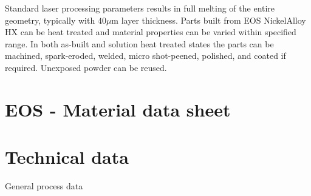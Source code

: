 \documentclass[10pt]{article}
\begin{document}
Standard laser processing parameters results in full melting of the entire geometry, typically with $40 \mu \mathrm{m}$ layer thickness. Parts built from EOS NickelAlloy HX can be heat treated and material properties can be varied within specified range. In both as-built and solution heat treated states the parts can be machined, spark-eroded, welded, micro shot-peened, polished, and coated if required. Unexposed powder can be reused.

\section*{EOS - Material data sheet}
\section*{Technical data}
General process data
\end{document}
